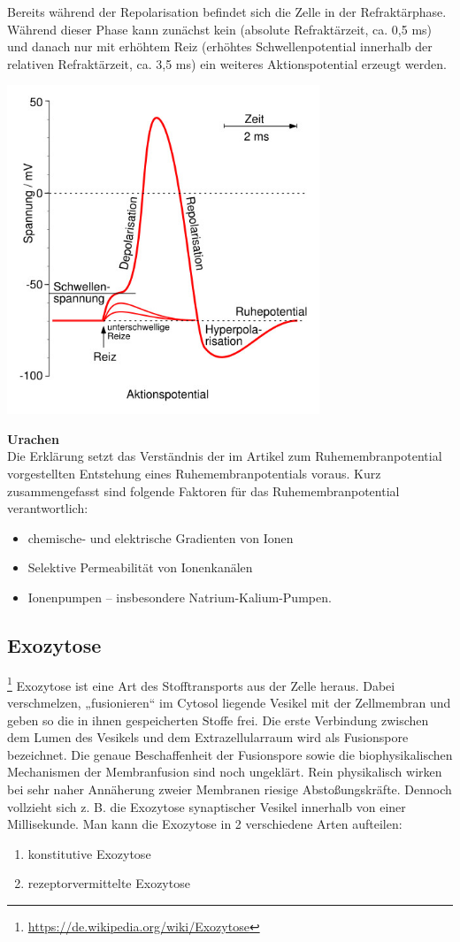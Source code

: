 Bereits während der Repolarisation befindet sich die Zelle in der Refraktärphase. Während dieser Phase kann zunächst kein (absolute Refraktärzeit, ca. 0,5 ms) und danach nur mit erhöhtem Reiz (erhöhtes Schwellenpotential innerhalb der relativen Refraktärzeit, ca. 3,5 ms) ein weiteres Aktionspotential erzeugt werden.

\includegraphics[width=0.7\textwidth]{lectures/terms/pix/Aktionspotential.jpg}

\textbf{Urachen}\\
Die Erklärung setzt das Verständnis der im Artikel zum Ruhemembranpotential vorgestellten Entstehung eines Ruhemembranpotentials voraus. Kurz zusammengefasst sind folgende Faktoren für das Ruhemembranpotential verantwortlich:
\begin{itemize}
    \item chemische- und elektrische Gradienten von Ionen
    \item Selektive Permeabilität von Ionenkanälen
    \item Ionenpumpen – insbesondere Natrium-Kalium-Pumpen.
\end{itemize}

\subsection{Exozytose}\footnote{\url{https://de.wikipedia.org/wiki/Exozytose}} Exozytose ist eine Art des Stofftransports aus der Zelle heraus. Dabei verschmelzen, „fusionieren“ im Cytosol liegende Vesikel mit der Zellmembran und geben so die in ihnen gespeicherten Stoffe frei. Die erste Verbindung zwischen dem Lumen des Vesikels und dem Extrazellularraum wird als Fusionspore bezeichnet. Die genaue Beschaffenheit der Fusionspore sowie die biophysikalischen Mechanismen der Membranfusion sind noch ungeklärt. Rein physikalisch wirken bei sehr naher Annäherung zweier Membranen riesige Abstoßungskräfte. Dennoch vollzieht sich z. B. die Exozytose synaptischer Vesikel innerhalb von einer Millisekunde.
Man kann die Exozytose in 2 verschiedene Arten aufteilen:
\begin{enumerate}
	\item konstitutive Exozytose
	\item rezeptorvermittelte Exozytose
\end{enumerate}

